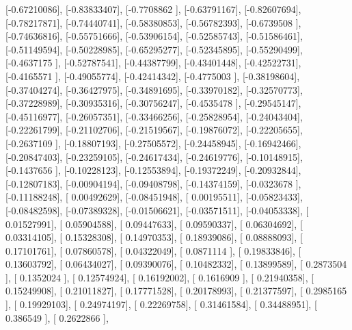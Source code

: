 \documentclass{article}
\begin{document}
       [-0.67210086],
       [-0.83833407],
       [-0.7708862 ],
       [-0.63791167],
       [-0.82607694],
       [-0.78217871],
       [-0.74440741],
       [-0.58380853],
       [-0.56782393],
       [-0.6739508 ],
       [-0.74636816],
       [-0.55751666],
       [-0.53906154],
       [-0.52585743],
       [-0.51586461],
       [-0.51149594],
       [-0.50228985],
       [-0.65295277],
       [-0.52345895],
       [-0.55290499],
       [-0.4637175 ],
       [-0.52787541],
       [-0.44387799],
       [-0.43401448],
       [-0.42522731],
       [-0.4165571 ],
       [-0.49055774],
       [-0.42414342],
       [-0.4775003 ],
       [-0.38198604],
       [-0.37404274],
       [-0.36427975],
       [-0.34891695],
       [-0.33970182],
       [-0.32570773],
       [-0.37228989],
       [-0.30935316],
       [-0.30756247],
       [-0.4535478 ],
       [-0.29545147],
       [-0.45116977],
       [-0.26057351],
       [-0.33466256],
       [-0.25828954],
       [-0.24043404],
       [-0.22261799],
       [-0.21102706],
       [-0.21519567],
       [-0.19876072],
       [-0.22205655],
       [-0.2637109 ],
       [-0.18807193],
       [-0.27505572],
       [-0.24458945],
       [-0.16942466],
       [-0.20847403],
       [-0.23259105],
       [-0.24617434],
       [-0.24619776],
       [-0.10148915],
       [-0.1437656 ],
       [-0.10228123],
       [-0.12553894],
       [-0.19372249],
       [-0.20932844],
       [-0.12807183],
       [-0.00904194],
       [-0.09408798],
       [-0.14374159],
       [-0.0323678 ],
       [-0.11188248],
       [ 0.00492629],
       [-0.08451948],
       [ 0.00195511],
       [-0.05823433],
       [-0.08482598],
       [-0.07389328],
       [-0.01506621],
       [-0.03571511],
       [-0.04053338],
       [ 0.01527991],
       [ 0.05904588],
       [ 0.09447633],
       [ 0.09590337],
       [ 0.06304692],
       [ 0.03314105],
       [ 0.15328308],
       [ 0.14970353],
       [ 0.18939086],
       [ 0.08888093],
       [ 0.17101761],
       [ 0.07860578],
       [ 0.04322049],
       [ 0.0871114 ],
       [ 0.19833846],
       [ 0.13603792],
       [ 0.06434027],
       [ 0.09390076],
       [ 0.10482332],
       [ 0.13899589],
       [ 0.2873504 ],
       [ 0.1352024 ],
       [ 0.12574924],
       [ 0.16192002],
       [ 0.1616909 ],
       [ 0.21940358],
       [ 0.15249908],
       [ 0.21011827],
       [ 0.17771528],
       [ 0.20178993],
       [ 0.21377597],
       [ 0.2985165 ],
       [ 0.19929103],
       [ 0.24974197],
       [ 0.22269758],
       [ 0.31461584],
       [ 0.34488951],
       [ 0.386549  ],
       [ 0.2622866 ],
\end{document}
